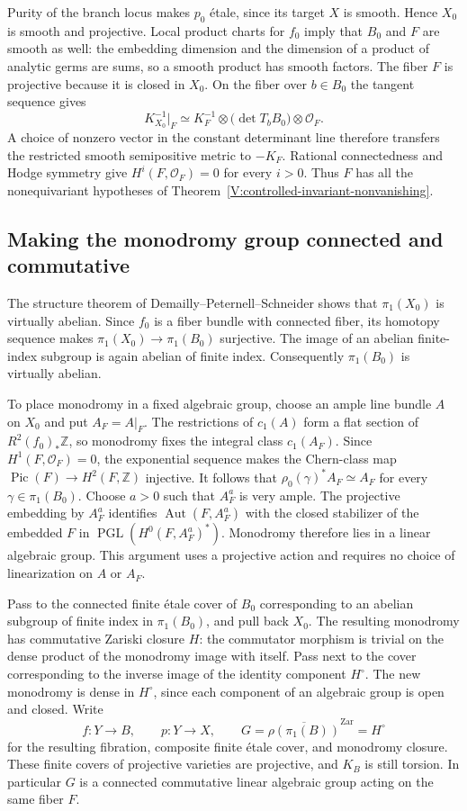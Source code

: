 Purity of the branch locus makes $p_0$ \'etale, since its target $X$
is smooth.  Hence $X_0$ is smooth and projective.  Local product charts
for $f_0$ imply that $B_0$ and $F$ are smooth as well: the embedding
dimension and the dimension of a product of analytic germs are sums,
so a smooth product has smooth factors.  The fiber $F$ is projective
because it is closed in $X_0$.  On the fiber over $b\in B_0$ the tangent
sequence gives
\[
 K_{X_0}^{-1}|_F\simeq K_F^{-1}\otimes
 \bigl(\det T_bB_0\bigr)\otimes\mathcal O_F.
\]
A choice of nonzero vector in the constant determinant line therefore
transfers the restricted smooth semipositive metric to $-K_F$.
Rational connectedness and Hodge symmetry give
$H^i(F,\mathcal O_F)=0$ for every $i>0$.  Thus $F$ has all the
nonequivariant hypotheses of
Theorem~\ref{V:controlled-invariant-nonvanishing}.

\subsection{Making the monodromy group connected and commutative}

The structure theorem of Demailly--Peternell--Schneider
\cite[Structure Theorem~(iii), p.~218]{DPS1996} shows that
$\pi_1(X_0)$ is virtually abelian.  Since $f_0$ is a fiber bundle with
connected fiber, its homotopy sequence makes
$\pi_1(X_0)\to\pi_1(B_0)$ surjective.  The image of an abelian
finite-index subgroup is again abelian of finite index.  Consequently
$\pi_1(B_0)$ is virtually abelian.

To place monodromy in a fixed algebraic group, choose an ample line
bundle $A$ on $X_0$ and put $A_F=A|_F$.  The restrictions of $c_1(A)$
form a flat section of $R^2(f_0)_*\mathbb Z$, so monodromy fixes the
integral class $c_1(A_F)$.  Since $H^1(F,\mathcal O_F)=0$, the exponential
sequence makes the Chern-class map
$\operatorname{Pic}(F)\to H^2(F,\mathbb Z)$ injective.  It follows that
$\rho_0(\gamma)^*A_F\simeq A_F$ for every $\gamma\in\pi_1(B_0)$.
Choose $a>0$ such that $A_F^a$ is very ample.  The projective embedding
by $A_F^a$ identifies $\operatorname{Aut}(F,A_F^a)$ with the closed stabilizer
of the embedded $F$ in $\operatorname{PGL}(H^0(F,A_F^a)^*)$.
Monodromy therefore lies in a linear algebraic group.  This argument
uses a projective action and requires no choice of linearization on
$A$ or $A_F$.

Pass to the connected finite \'etale cover of $B_0$ corresponding to
an abelian subgroup of finite index in $\pi_1(B_0)$, and pull back
$X_0$.  The resulting monodromy has commutative Zariski closure $H$:
the commutator morphism is trivial on the dense product of the
monodromy image with itself.  Pass next to the cover corresponding to
the inverse image of the identity component $H^\circ$.  The new
monodromy is dense in $H^\circ$, since each component of an algebraic
group is open and closed.  Write
\[
 f:Y\longrightarrow B,\qquad p:Y\longrightarrow X,
 \qquad G=\overline{\rho(\pi_1(B))}^{\mathrm{Zar}}=H^\circ
\]
for the resulting fibration, composite finite \'etale cover, and
monodromy closure.  These finite covers of projective varieties are
projective, and $K_B$ is still torsion.  In particular $G$ is a
connected commutative linear algebraic group acting on the same
fiber $F$.

